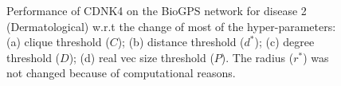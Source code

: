 \documentclass[review]{elsarticle}
\begin{document}
\begin{figure}[h]
\centering
{}
\qquad
{}
\caption{\label{fig:globfig} Performance of CDNK4 on the BioGPS network for disease 2 (Dermatological) w.r.t the change of most of the hyper-parameters: (a) clique threshold ($C$); (b) distance threshold ($d^*$); (c) degree threshold ($D$); (d) real vec size threshold ($P$). The radius ($r^*$) was not changed because of computational reasons.}
\end{figure}
\end{document}
